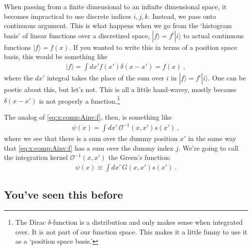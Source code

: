 \documentclass[12pt]{article}
\numberwithin{equation}{section}    %
\begin{document}
When passing from a finite dimensional to an infinite dimensional space, it becomes impractical to use discrete indices $i,j,k$. Instead, we pass onto continuous argument. This is what happens when we go from the `histogram basis’ of linear functions over a discretized space, $|f\rangle = f^i|i\rangle$ to actual continuous functions $|f\rangle = f(x)$. If you wanted to write this in terms of a position space basis, this would be something like
\begin{align}
  |f\rangle = \int dx' f(x')\delta(x-x')  = f(x)\ ,
\end{align}
where the $dx'$ integral takes the place of the sum over $i$ in $|f\rangle = f^i|i\rangle$. One can be poetic about this, but let’s not. This is all a little hand-wavey, mostly because $\delta(x-x')$ is not properly a function.\footnote{The Dirac $\delta$-function is a distribution and only makes sense when integrated over. It is not part of our function space. This makes it a little funny to use it as a `position space basis.’}

The analog of \eqref{eq:x:comp:Ainv:f}, then, is something like
\begin{align}
  \psi(x) = \int dx' \,\mathcal{O}^{-1}(x,x') s(x') \ ,
\end{align}
where we see that there is a sum over the dummy position $x'$ in the same way that \eqref{eq:x:comp:Ainv:f} has a sum over the dummy index $j$. We’re going to call the integration kernel $\mathcal{O}^{-1}(x,x')$ the Green’s function:
\begin{align}
  \psi(x) \equiv \int dx' \,G(x,x') s(x') \ .
  \label{eq:Green:basic}
\end{align}








\subsection{You’ve seen this before}
\label{sec:electrostatics:analog}
\end{document}
